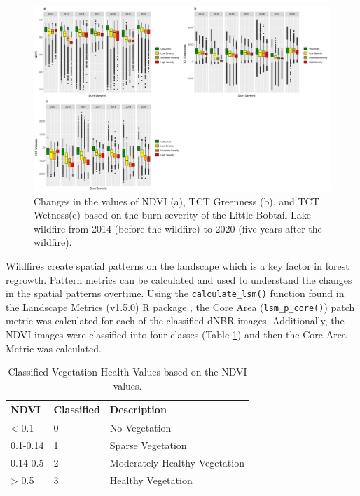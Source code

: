 \documentclass[
]{book}
\begin{document}
\begin{figure}
\includegraphics[width=66.67in]{images/13-VIPlots} \caption{Changes in the values of NDVI (a), TCT Greenness (b), and TCT Wetness(c) based on the burn severity of the Little Bobtail Lake wildfire from 2014 (before the wildfire) to 2020 (five years after the wildfire).}\label{fig:unnamed-chunk-40}
\end{figure}

Wildfires create spatial patterns on the landscape which is a key factor in forest regrowth. Pattern metrics can be calculated and used to understand the changes in the spatial patterns overtime. Using the \texttt{calculate\_lsm()} function found in the Landscape Metrics (v1.5.0) R package \citep{hesselbarth_landscapemetrics_2019}, the Core Area (\texttt{lsm\_p\_core()}) patch metric was calculated for each of the classified dNBR images. Additionally, the NDVI images were classified into four classes (Table \ref{tab:13-murray-case-study-table-2}) and then the Core Area Metric was calculated.

\begin{table}

\caption{\label{tab:13-murray-case-study-table-2}Classified Vegetation Health Values based on the NDVI values.}
\centering
\begin{tabular}[t]{l|l|l}
\hline
NDVI & Classified & Description\\
\hline
< 0.1 & 0 & No Vegetation\\
\hline
0.1-0.14 & 1 & Sparse Vegetation\\
\hline
0.14-0.5 & 2 & Moderately Healthy Vegetation\\
\hline
> 0.5 & 3 & Healthy Vegetation\\
\hline
\end{tabular}
\end{table}
\end{document}
